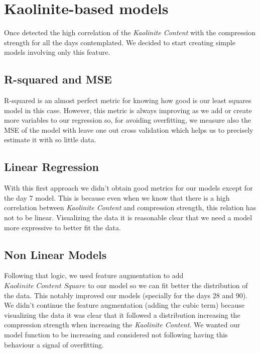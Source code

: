 \documentclass[10pt,conference,compsocconf]{IEEEtran}
\begin{document}
\section{Kaolinite-based models}


Once detected the high correlation of the \textit{Kaolinite Content} with the compression strength for all the days contemplated. We decided to start creating simple models involving only this feature. %

\subsection{R-squared and MSE}
R-squared is an almost perfect metric for knowing how good is our least squares model in this case. However, this metric is always improving as we add or create more variables to our regression so, for avoiding overfitting, we measure also the MSE of the model with leave one out cross validation which helps us to precisely estimate it with so little  data. 

\subsection{Linear Regression}
With this first approach we didn't obtain good metrics for our models except for the day 7 model. This is because even when we know that there is a high correlation between \textit{Kaolinite Content} and compression strength, this relation has not to be linear. Visualizing the data it is reasonable clear that we need a model more expressive to better fit the data.

\subsection{Non Linear Models}
Following that logic, we used feature augmentation to add $\textit{Kaolinite Content Square}$ to our model so we can fit better the distribution of the data. This notably improved our models (specially for the days 28 and 90). We didn't continue the feature augmentation (adding the cubic term) because visualizing the data it was clear that it followed a distribution increasing the compression strength when increasing the \textit{Kaolinite Content}. We wanted our model function to be increasing and considered not following having this behaviour a signal of overfitting.
\end{document}
